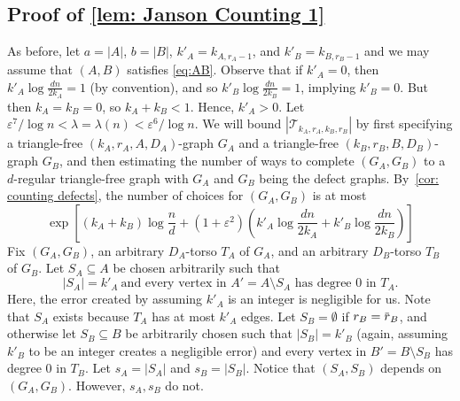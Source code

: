 \documentclass[11pt]{article}
\newcommand{\eps}{\varepsilon}
\newcommand{\overbar}[1]{\mkern 1.5mu\overline{\mkern-1.5mu#1\mkern-1.5mu}\mkern 1.5mu}
\theoremstyle{plain}
\begin{document}

\subsection{Proof of \cref{lem: Janson Counting 1}}\label{sec: Janson Counting 1}
 As before,     let $a = |A|$, $b = |B|$, $k'_A = k_{A, r_A - 1}$, and $k'_B = k_{B, r_B - 1}$ and we may assume that $(A,B)$ satisfies \eqref{eq:AB}. Observe that if $k'_A = 0$, then $k'_A\log\frac{dn}{2k_A} = 1$ (by convention), and so $k'_B\log\frac{dn}{2k_B} = 1$, implying $k'_B = 0$. But then $k_A = k_B = 0$, so $k_A + k_B < 1$. Hence, $k'_A > 0$.
Let $\eps^7/\log n < \lambda  = \lambda (n) < \eps^6/\log n$. %
We will bound $|\mathcal T_{k_A, r_A, k_B, r_B}|$ by first specifying a triangle-free $(k_A, r_A, A, D_{A})$-graph $G_A$ and a triangle-free $(k_B, r_B, B, D_{B})$-graph $G_B$, and then estimating the number of ways to complete $(G_A,G_B)$ to a $d$-regular triangle-free graph with $G_A$ and $G_B$ being the defect graphs.
By~\cref{cor: counting defects},
 the number of choices for $(G_A,G_B)$ is at most
    \begin{equation}
\exp\left[(k_A+k_B)\log\frac{n}{d} + (1 + \varepsilon^2)\left(k'_A\log\frac{dn}{2k_A}+k'_B\log\frac{dn}{2k_B}\right)\right]\label{eq:defectbounds}
    \end{equation}
Fix $(G_A,G_B)$, an arbitrary $D_A$-torso $T_A$ of $G_A$, and an arbitrary $D_B$-torso $T_B$ of $G_B$. Let $S_A \subseteq A$ be chosen arbitrarily such that 
\begin{equation}
|S_A| = k'_A\ \text{and every vertex in $A' = A \setminus S_A$ has degree $0$ in $T_A$}.\label{eq:sizeSA}
\end{equation}
Here, the error created by assuming $k'_A$ is an integer is negligible for us. Note that $S_A$ exists because $T_A$ has at most $k'_A$ edges.
Let $S_B = \emptyset$ if $r_B = \overbar{r}_{B}$, and otherwise let $S_B \subseteq B$ be arbitrarily chosen such that $|S_B| = k'_B$ (again, assuming $k'_B$ to be an integer creates a negligible error) and every vertex in $B' = B \setminus S_B$ has degree $0$ in $T_B$. Let $s_A=|S_A| $ and $s_B=|S_B| $. Notice that $(S_A,S_B)$ depends on $(G_A,G_B)$. However, $s_A,s_B$ do not.
\end{document}
